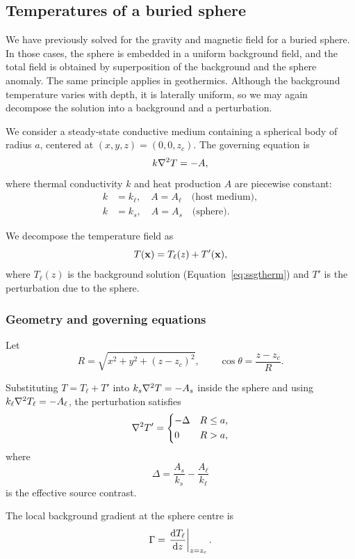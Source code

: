 \subsection{Temperatures of a buried sphere}

We have previously solved for the gravity and magnetic field for a buried sphere. In those cases, the sphere is embedded in a uniform background field, and the total field is obtained by superposition of the background and the sphere anomaly. The same principle applies in geothermics. Although the background temperature varies with depth, it is laterally uniform, so we may again decompose the solution into a background and a perturbation.

We consider a steady-state conductive medium containing a spherical body of radius $a$, centered at $(x,y,z) = (0,0,z_c)$. The governing equation is
\[
    k \laplacian T = -A,
\]
where thermal conductivity $k$ and heat production $A$ are piecewise constant:
\begin{align*}
    k &= k_\ell, \quad A = A_\ell \quad \text{(host medium)}, \\
    k &= k_s, \quad A = A_s \quad \text{(sphere)}.
\end{align*}

We decompose the temperature field as
\[
    T(\vb{x}) = T_\ell(z) + T'(\vb{x}),
\]
where $T_\ell(z)$ is the background solution (Equation~\ref{eq:ssgtherm}) and $T'$ is the perturbation due to the sphere.

\subsubsection*{Geometry and governing equations}

Let
\[
    R = \sqrt{x^2 + y^2 + (z - z_c)^2}, \qquad
    \cos\theta = \frac{z - z_c}{R}.
\]

Substituting $T = T_\ell + T'$ into $k_s \laplacian T = -A_s$ inside the sphere and using $k_\ell \laplacian T_\ell = -A_\ell$, the perturbation satisfies
\[
    \laplacian T' =
    \begin{dcases}
        -\Delta & R \leq a, \\
        0       & R > a,
    \end{dcases}
\]
where
\[
    \Delta = \frac{A_s}{k_s} - \frac{A_\ell}{k_\ell}
\]
is the effective source contrast.

The local background gradient at the sphere centre is
\[
    \Gamma = \eval{\dv{T_\ell}{z}}_{z=z_c}.
\]

